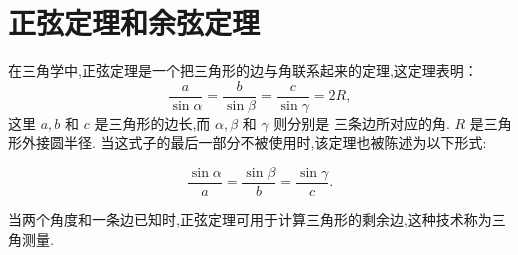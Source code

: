 \documentclass[main]{subfiles}
\begin{document}
\renewcommand{\filename}{subfile23}%


\section{正弦定理和余弦定理}


在三角学中,正弦定理是一个把三角形的边与角联系起来的定理,这定理表明：
$$
\frac{a}{\sin \alpha}=\frac{b}{\sin \beta}=\frac{c}{\sin \gamma}=2 R,
$$
这里 $a, b$ 和 $c$ 是三角形的边长,而 $\alpha, \beta$ 和 $\gamma$ 则分别是
三条边所对应的角. $R$ 是三角形外接圆半径.
当这式子的最后一部分不被使用时,该定理也被陈述为以下形式:

$$
\frac{\sin \alpha}{a}=\frac{\sin \beta}{b}=\frac{\sin \gamma}{c} .
$$



当两个角度和一条边已知时,正弦定理可用于计算三角形的剩余边,这种技术称为三角测量. 
\end{document}
